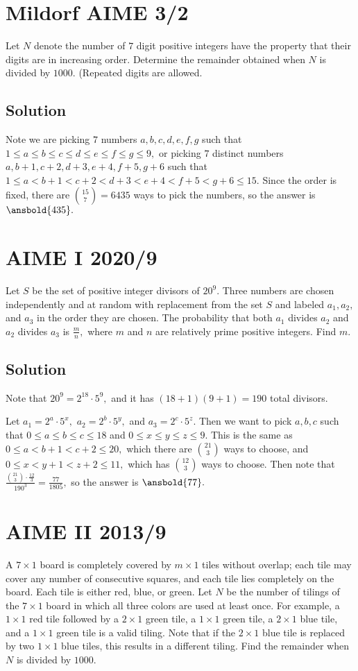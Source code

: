 \documentclass{article}
\begin{document}
\pagebreak\section{Mildorf AIME 3/2}
Let $N$ denote the number of $7$ digit positive integers have the property that their digits are in increasing order. Determine the remainder obtained when $N$ is divided by $1000$. (Repeated digits are allowed.

\subsection{Solution}
Note we are picking $7$ numbers $a,b,c,d,e,f,g$ such that $1\leq a\leq b\leq c\leq d\leq e\leq f\leq g\leq 9,$ or picking $7$ distinct numbers $a,b+1,c+2,d+3,e+4,f+5,g+6$ such that $1\leq a< b+1< c+2< d+3< e+4< f+5< g+6\leq 15.$ Since the order is fixed, there are $\binom{15}{7}=6435$ ways to pick the numbers, so the answer is $\ansbold{435}.$

\pagebreak\section{AIME I 2020/9}
Let $S$ be the set of positive integer divisors of $20^9.$ Three numbers are chosen independently and at random with replacement from the set $S$ and labeled $a_1,a_2,$ and $a_3$ in the order they are chosen. The probability that both $a_1$ divides $a_2$ and $a_2$ divides $a_3$ is $\tfrac{m}{n},$ where $m$ and $n$ are relatively prime positive integers. Find $m.$

\subsection{Solution}
Note that $20^9=2^{18}\cdot 5^9,$ and it has $(18+1)(9+1)=190$ total divisors.
    
Let $a_1=2^a\cdot 5^x,$ $a_2=2^b\cdot 5^y,$ and $a_3=2^c\cdot 5^z.$ Then we want to pick $a,b,c$ such that $0\leq a\leq b\leq c\leq 18$ and $0\leq x\leq y\leq z\leq 9.$ This is the same as $0\leq a<b+1<c+2\leq 20,$ which there are $\binom{21}{3}$ ways to choose, and $0\leq x<y+1<z+2\leq 11,$ which has $\binom{12}{3}$ ways to choose. Then note that $\frac{\binom{21}{3}\cdot\frac{12}{3}}{190^3}=\frac{77}{1805},$ so the answer is $\ansbold{77}.$

\pagebreak\section{AIME II 2013/9}
A $7\times 1$ board is completely covered by $m\times 1$ tiles without overlap; each tile may cover any number of consecutive squares, and each tile lies completely on the board. Each tile is either red, blue, or green. Let $N$ be the number of tilings of the $7\times 1$ board in which all three colors are used at least once. For example, a $1\times 1$ red tile followed by a $2\times 1$ green tile, a $1\times 1$ green tile, a $2\times 1$ blue tile, and a $1\times 1$ green tile is a valid tiling. Note that if the $2\times 1$ blue tile is replaced by two $1\times 1$ blue tiles, this results in a different tiling. Find the remainder when $N$ is divided by $1000$.
\end{document}
